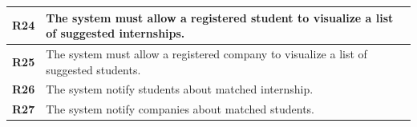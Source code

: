 \begin{table}[H]
\begin{tabular}{|l|m{10cm}|}
        \hline \textbf{R24} & The system must allow a registered student to visualize a list of suggested internships. \\
        \hline \textbf{R25} & The system must allow a registered company to visualize a list of suggested students. \\
        \hline \textbf{R26} & The system notify students about matched internship. \\
        \hline \textbf{R27} & The system notify companies about matched students. \\
        \hline
    \end{tabular}
\end{table}

